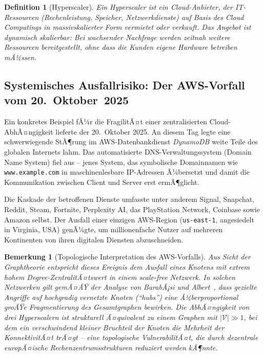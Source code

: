 ﻿\documentclass[12pt, a4paper, openany]{report}
\newtheorem{definition}[theorem]{Definition}
\newtheorem{remark}[theorem]{Bemerkung}
\newcommand{\calV}{\mathcal{V}}
\begin{document}
\begin{definition}[Hyperscaler]
	\label{def:hyperscaler}
	Ein \emph{Hyperscaler} ist ein Cloud-Anbieter, der IT-Ressourcen
	(Rechenleistung, Speicher, Netzwerkdienste) auf Basis des Cloud
	Computings in massivskalierter Form vermietet oder verkauft. Das Angebot
	ist dynamisch skalierbar: Bei wachsender Nachfrage werden zeitnah weitere
	Ressourcen bereitgestellt, ohne dass die Kunden eigene Hardware betreiben
	mÃ¼ssen.
\end{definition}

\subsection{Systemisches Ausfallrisiko: Der AWS-Vorfall vom 20.~Oktober~2025}

Ein konkretes Beispiel fÃ¼r die FragilitÃ¤t einer zentralisierten Cloud-AbhÃ¤ngigkeit
lieferte der 20.~Oktober 2025. An diesem Tag legte eine schwerwiegende StÃ¶rung
im AWS-Datenbankdienst \textit{DynamoDB} weite Teile des globalen Internets
lahm. Das automatisierte DNS-Verwaltungssystem (Domain Name System) fiel aus --
jenes System, das symbolische Domainnamen wie \texttt{www.example.com} in
maschinenlesbare IP-Adressen Ã¼bersetzt und damit die Kommunikation zwischen
Client und Server erst ermÃ¶glicht.

Die Kaskade der betroffenen Dienste umfasste unter anderem Signal, Snapchat,
Reddit, Steam, Fortnite, Perplexity AI, das PlayStation Network, Coinbase sowie
Amazon selbst. Der Ausfall einer einzigen AWS-Region (\texttt{us-east-1},
angesiedelt in Virginia, USA) genÃ¼gte, um millionenfache Nutzer auf mehreren
Kontinenten von ihren digitalen Diensten abzuschneiden.

\begin{remark}[Topologische Interpretation des AWS-Vorfalls]
	\label{rem:aws_topologie}
	Aus Sicht der Graphtheorie entspricht dieses Ereignis dem Ausfall eines
	Knotens mit extrem hohem Degree-ZentralitÃ¤tswert in einem scale-free
	Netzwerk. In solchen Netzwerken gilt gemÃ¤ÃŸ der Analyse von BarabÃ¡si und
	Albert~\cite{barabasi99}, dass gezielte Angriffe auf hochgradig vernetzte
	Knoten (``hubs'') eine Ã¼berproportional groÃŸe Fragmentierung des Gesamtgraphen
	bewirken. Die AbhÃ¤ngigkeit von drei Hyperscalern ist strukturell Ã¤quivalent
	zu einem Graphen mit $|\calV| \gg 1$, bei dem ein verschwindend kleiner
	Bruchteil der Knoten die Mehrheit der KonnektivitÃ¤t trÃ¤gt -- eine
	topologische VulnerabilitÃ¤t, die durch dezentrale europÃ¤ische
	Rechenzentrumsstrukturen reduziert werden kÃ¶nnte.
\end{remark}
\end{document}
